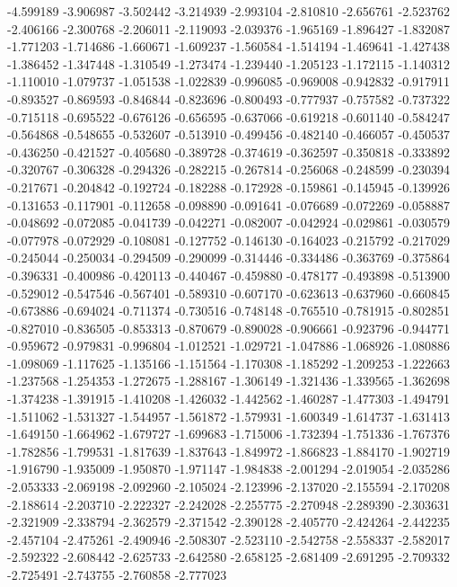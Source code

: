 -4.599189
-3.906987
-3.502442
-3.214939
-2.993104
-2.810810
-2.656761
-2.523762
-2.406166
-2.300768
-2.206011
-2.119093
-2.039376
-1.965169
-1.896427
-1.832087
-1.771203
-1.714686
-1.660671
-1.609237
-1.560584
-1.514194
-1.469641
-1.427438
-1.386452
-1.347448
-1.310549
-1.273474
-1.239440
-1.205123
-1.172115
-1.140312
-1.110010
-1.079737
-1.051538
-1.022839
-0.996085
-0.969008
-0.942832
-0.917911
-0.893527
-0.869593
-0.846844
-0.823696
-0.800493
-0.777937
-0.757582
-0.737322
-0.715118
-0.695522
-0.676126
-0.656595
-0.637066
-0.619218
-0.601140
-0.584247
-0.564868
-0.548655
-0.532607
-0.513910
-0.499456
-0.482140
-0.466057
-0.450537
-0.436250
-0.421527
-0.405680
-0.389728
-0.374619
-0.362597
-0.350818
-0.333892
-0.320767
-0.306328
-0.294326
-0.282215
-0.267814
-0.256068
-0.248599
-0.230394
-0.217671
-0.204842
-0.192724
-0.182288
-0.172928
-0.159861
-0.145945
-0.139926
-0.131653
-0.117901
-0.112658
-0.098890
-0.091641
-0.076689
-0.072269
-0.058887
-0.048692
-0.072085
-0.041739
-0.042271
-0.082007
-0.042924
-0.029861
-0.030579
-0.077978
-0.072929
-0.108081
-0.127752
-0.146130
-0.164023
-0.215792
-0.217029
-0.245044
-0.250034
-0.294509
-0.290099
-0.314446
-0.334486
-0.363769
-0.375864
-0.396331
-0.400986
-0.420113
-0.440467
-0.459880
-0.478177
-0.493898
-0.513900
-0.529012
-0.547546
-0.567401
-0.589310
-0.607170
-0.623613
-0.637960
-0.660845
-0.673886
-0.694024
-0.711374
-0.730516
-0.748148
-0.765510
-0.781915
-0.802851
-0.827010
-0.836505
-0.853313
-0.870679
-0.890028
-0.906661
-0.923796
-0.944771
-0.959672
-0.979831
-0.996804
-1.012521
-1.029721
-1.047886
-1.068926
-1.080886
-1.098069
-1.117625
-1.135166
-1.151564
-1.170308
-1.185292
-1.209253
-1.222663
-1.237568
-1.254353
-1.272675
-1.288167
-1.306149
-1.321436
-1.339565
-1.362698
-1.374238
-1.391915
-1.410208
-1.426032
-1.442562
-1.460287
-1.477303
-1.494791
-1.511062
-1.531327
-1.544957
-1.561872
-1.579931
-1.600349
-1.614737
-1.631413
-1.649150
-1.664962
-1.679727
-1.699683
-1.715006
-1.732394
-1.751336
-1.767376
-1.782856
-1.799531
-1.817639
-1.837643
-1.849972
-1.866823
-1.884170
-1.902719
-1.916790
-1.935009
-1.950870
-1.971147
-1.984838
-2.001294
-2.019054
-2.035286
-2.053333
-2.069198
-2.092960
-2.105024
-2.123996
-2.137020
-2.155594
-2.170208
-2.188614
-2.203710
-2.222327
-2.242028
-2.255775
-2.270948
-2.289390
-2.303631
-2.321909
-2.338794
-2.362579
-2.371542
-2.390128
-2.405770
-2.424264
-2.442235
-2.457104
-2.475261
-2.490946
-2.508307
-2.523110
-2.542758
-2.558337
-2.582017
-2.592322
-2.608442
-2.625733
-2.642580
-2.658125
-2.681409
-2.691295
-2.709332
-2.725491
-2.743755
-2.760858
-2.777023
